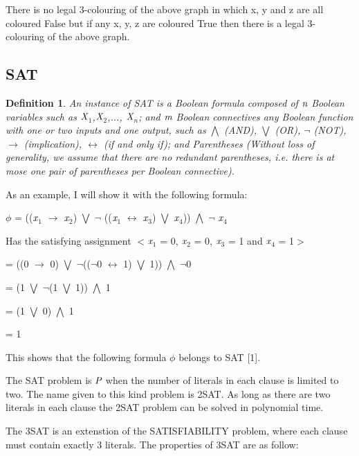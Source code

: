 \documentclass[a4paper]{report}
\newtheorem{defi}{Definition}
\begin{document}
There is no legal 3-colouring of the above graph in which x, y and z are all coloured False but if any x, y, z are coloured True then there is a legal 3-colouring of the above graph.
\subsection{SAT}

\begin{defi}
An instance of SAT is a Boolean formula composed of $\emph{n}$ Boolean variables such as $\emph{X}$$_{1}$,$\emph{X}$$_{2}$,..., $\emph{X}$$_{n}$; and $\emph{m}$ Boolean connectives any Boolean function with one or two inputs and one output, such as $\bigwedge$ (AND), $\bigvee$ (OR), $\neg$ (NOT), $\rightarrow$ (implication), $\leftrightarrow$ (if and only if); and Parentheses (Without loss of generality, we assume that there are no redundant parentheses, i.e. there is at mose one pair of parentheses per Boolean connective).
\end{defi}

As an example, I will show it with the following formula:

$\phi$ = (($\emph{x}$$_{1}$ $\rightarrow$ $\emph{x}$$_{2}$) $\bigvee$ $\neg$ (($\emph{x}$$_{1}$ $\leftrightarrow$ $\emph{x}$$_{3}$) $\bigvee$ $\emph{x}$$_{4}$)) $\bigwedge$ $\neg$ $\emph{x}$$_{4}$


Has the satisfying assignment $<$$\emph{x}$$_{1}$ = 0, $\emph{x}$$_{2}$ = 0, $\emph{x}$$_{3}$ = 1 and $\emph{x}$$_{4}$ = 1$>$

= ((0 $\rightarrow$ 0) $\bigvee$ $\neg$(($\neg$0 $\leftrightarrow$ 1) $\bigvee$ 1)) $\bigwedge$ $\neg$0

= (1 $\bigvee$ $\neg$(1 $\bigvee$ 1)) $\bigwedge$ 1

= (1 $\bigvee$ 0) $\bigwedge$ 1

= 1


This shows that the following formula $\phi$ belongs to SAT [1].

\vspace{3mm}
The SAT problem is $\emph{P}$ when the number of literals in each clause is limited to two. The name given to this kind problem is 2SAT. As long as there are two literals in each clause the 2SAT problem can be solved in polynomial time.

\vspace{3mm}
The 3SAT is an extenstion of the SATISFIABILITY problem, where each clause must contain exactly 3 literals. The properties of 3SAT are as follow:
\end{document}
